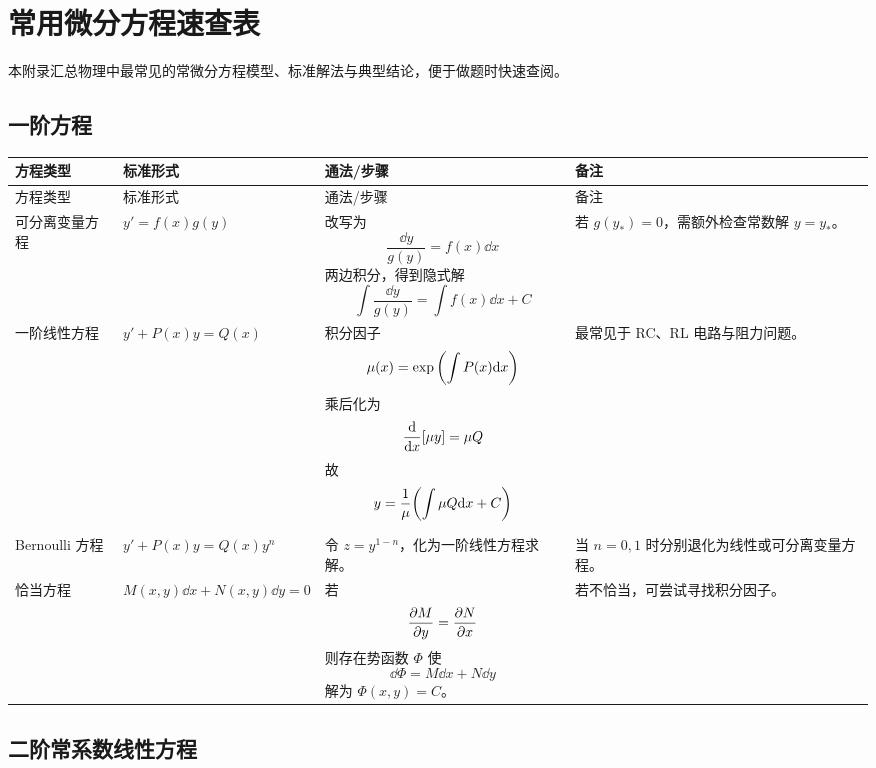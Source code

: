 \chapter{常用微分方程速查表}

本附录汇总物理中最常见的常微分方程模型、标准解法与典型结论，便于做题时快速查阅。

\section{一阶方程}

\begin{longtable}{p{}p{}p{}p{}}
\toprule
方程类型 & 标准形式 & 通法/步骤 & 备注 \\
\midrule
\endfirsthead
\toprule
方程类型 & 标准形式 & 通法/步骤 & 备注 \\
\midrule
\endhead
\bottomrule
\endfoot
可分离变量方程 & $y'=f(x)g(y)$ & 改写为
\[
\frac{\dd y}{g(y)}=f(x)\dd x
\]
两边积分，得到隐式解
\[
\int \frac{\dd y}{g(y)}=\int f(x)\dd x +C
\]
 & 若 $g(y_*)=0$，需额外检查常数解 $y=y_*$。 \\

一阶线性方程 & $y'+P(x)y=Q(x)$ & 积分因子
\[
\mu(x)=\exp\qty(\int P(x)\dd x)
\]
乘后化为
\[
\dv{}{x}[\mu y]=\mu Q
\]
故
\[
 y=\frac{1}{\mu}\qty(\int \mu Q\dd x+C)
\]
 & 最常见于 RC、RL 电路与阻力问题。 \\

Bernoulli 方程 & $y'+P(x)y=Q(x)y^n$ & 令 $z=y^{1-n}$，化为一阶线性方程求解。 & 当 $n=0,1$ 时分别退化为线性或可分离变量方程。 \\

恰当方程 & $M(x,y)\dd x+N(x,y)\dd y=0$ & 若
\[
\pdv{M}{y}=\pdv{N}{x}
\]
则存在势函数 $\Phi$ 使
\[
\dd \Phi=M\dd x+N\dd y
\]
解为 $\Phi(x,y)=C$。 & 若不恰当，可尝试寻找积分因子。 \\
\end{longtable}

\section{二阶常系数线性方程}

